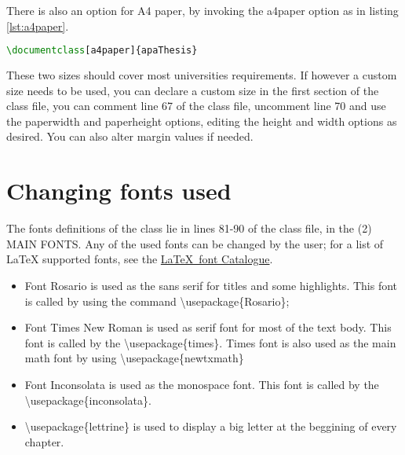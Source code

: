 	There is also an option for A4 paper, by invoking the {\ttfamily\small a4paper} option as in listing \ref{lst:a4paper}.

\begin{lstlisting}[caption = {Using the class with A4 paper size}, label = {lst:a4paper}, style = prettyListing, language = tex]
\documentclass[a4paper]{apaThesis}
\end{lstlisting}

	These two sizes should cover most universities requirements. If however a custom size needs to be used, you can declare a custom size in the first section of the class file, you can comment line 67 of the class file, uncomment line 70 and use the {\ttfamily\small paperwidth} and {\ttfamily\small paperheight} options, editing the height and width options as desired. You can also alter margin values if needed.

	\section{Changing fonts used}%

	The fonts definitions of the class lie in lines 81-90 of the class file, in the {\ttfamily\small (2) MAIN FONTS}. Any of the used fonts can be changed by the user; for a list of LaTeX supported fonts, see the \href{https://tug.org/FontCatalogue/}{\LaTeX\ font Catalogue}.

\begin{itemize}
	\item Font Rosario is used as the sans serif for titles and some highlights. This font is called by using the command {\ttfamily \textbackslash usepackage\{Rosario\}};
	\item Font Times New Roman is used as serif font for most of the text body. This font is called by the {\ttfamily\small \textbackslash usepackage\{times\}}. Times font is also used as the main math font by using {\ttfamily\small \textbackslash usepackage\{newtxmath\}}
	\item Font Inconsolata is used as the monospace font. This font is called by the {\ttfamily\small \textbackslash usepackage\{inconsolata\}}.
	\item {\ttfamily\small \textbackslash usepackage\{lettrine\}} is used to display a big letter at the beggining of every chapter.
\end{itemize}

